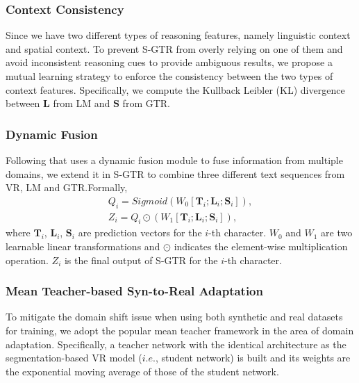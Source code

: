 \documentclass[letterpaper]{article} \usepackage{aaai22}  \usepackage{times}  \usepackage{helvet}  \usepackage{courier}  \usepackage[hyphens]{url}  \usepackage{graphicx} \urlstyle{rm} \def\UrlFont{\rm}  \usepackage{natbib}  \usepackage{caption} \DeclareCaptionStyle{ruled}{labelfont=normalfont,labelsep=colon,strut=off} \frenchspacing  \setlength{\pdfpagewidth}{8.5in}  \setlength{\pdfpageheight}{11in}
\begin{document}
\subsubsection{Context Consistency}
Since we have two different types of reasoning features, namely linguistic context and spatial context. To prevent S-GTR from overly relying on one of them and avoid inconsistent reasoning cues to provide ambiguous results, we propose a mutual learning strategy to enforce the consistency between the two types of context features. Specifically, we compute the Kullback Leibler (KL) divergence between $\mathbf{L}$ from LM and $\mathbf{S}$ from GTR. 


\subsubsection{Dynamic Fusion}
\label{subsec:dynamicfusion}
Following \cite{yue2020robustscanner} that uses a dynamic fusion module to fuse information from multiple domains, we extend it in S-GTR to combine three different text sequences from VR, LM and GTR.Formally,
\begin{equation}
\begin{aligned}
   Q_{i} = Sigmoid(W_{0}[\mathbf{T}_i;\mathbf{L}_i;\mathbf{S}_i]), \\
    Z_{i} = Q_{i}\odot(W_{1}[\mathbf{T}_i;\mathbf{L}_i;\mathbf{S}_i]),
\end{aligned}
\end{equation}
where $\mathbf{T}_i$, $\mathbf{L}_i$, $\mathbf{S}_i$ are prediction vectors for the $i$-th character. $W_{0}$ and $W_{1}$ are two learnable linear transformations and $\odot$ indicates the element-wise multiplication operation. $Z_i$ is the final output of S-GTR for the $i$-th character.



\subsubsection{Mean Teacher-based Syn-to-Real Adaptation}
To mitigate the domain shift issue when using both synthetic and real datasets for training, we adopt the popular mean teacher framework \cite{meanteacher} in the area of domain adaptation. Specifically, a teacher network with the identical architecture as the segmentation-based VR model ($i.e.$, student network) is built and its weights are the exponential moving average of those of the student network.
\end{document}
